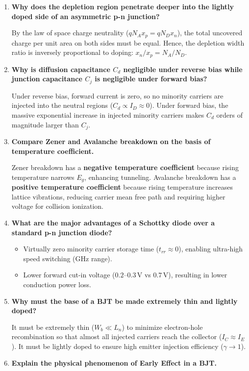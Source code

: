 \documentclass[12pt,a4paper]{article}
\newcommand{\Q}[1]{\textbf{#1}\par\noindent\ignorespaces}
\begin{document}
\begin{tcolorbox}[exambox, title={\textbf{Frequently Asked / Viva Questions}}]
\begin{enumerate}[topsep=0pt, label=\textbf{Q\arabic*.}, itemsep=5pt]
  \item \Q{Why does the depletion region penetrate deeper into the lightly doped side of an asymmetric p-n junction?}
    By the law of space charge neutrality ($q N_A x_p = q N_D x_n$), the total uncovered charge per unit area on both sides must be equal. Hence, the depletion width ratio is inversely proportional to doping: $x_n / x_p = N_A / N_D$.
  \item \Q{Why is diffusion capacitance $C_d$ negligible under reverse bias while junction capacitance $C_j$ is negligible under forward bias?}
    Under reverse bias, forward current is zero, so no minority carriers are injected into the neutral regions ($C_d \propto I_D \approx 0$). Under forward bias, the massive exponential increase in injected minority carriers makes $C_d$ orders of magnitude larger than $C_j$.
  \item \Q{Compare Zener and Avalanche breakdown on the basis of temperature coefficient.}
    Zener breakdown has a \textbf{negative temperature coefficient} because rising temperature narrows $E_g$, enhancing tunneling. Avalanche breakdown has a \textbf{positive temperature coefficient} because rising temperature increases lattice vibrations, reducing carrier mean free path and requiring higher voltage for collision ionization.
  \item \Q{What are the major advantages of a Schottky diode over a standard p-n junction diode?}
    \begin{itemize}[leftmargin=*, itemsep=1pt, topsep=2pt]
      \item Virtually zero minority carrier storage time ($t_{rr} \approx 0$), enabling ultra-high speed switching (GHz range).
      \item Lower forward cut-in voltage ($0.2\text{--}0.3\,\text{V}$ vs $0.7\,\text{V}$), resulting in lower conduction power loss.
    \end{itemize}
  \item \Q{Why must the base of a BJT be made extremely thin and lightly doped?}
    It must be extremely thin ($W_b \ll L_n$) to minimize electron-hole recombination so that almost all injected carriers reach the collector ($I_C \approx I_E$). It must be lightly doped to ensure high emitter injection efficiency ($\gamma \to 1$).
  \item \Q{Explain the physical phenomenon of Early Effect in a BJT.}

\end{enumerate}
\end{tcolorbox}
\end{document}
